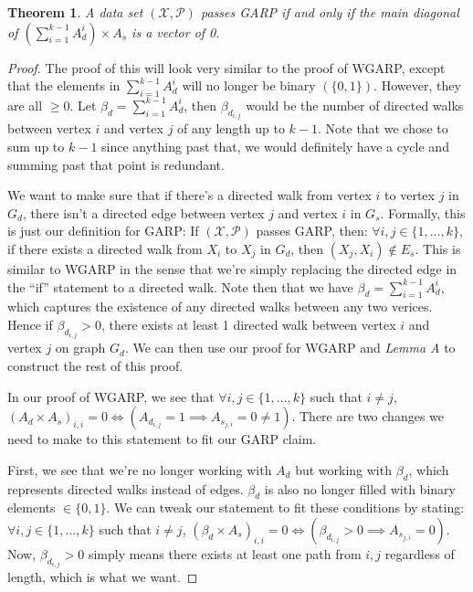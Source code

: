 \documentclass{article} %
\newtheorem{theorem}{Theorem}
\begin{document}
\begin{theorem}
\label{thm:GARP}
A data set $(\mathcal{X},\mathcal{P})$ passes GARP if and only if the main diagonal of $(\sum_{i=1}^{k-1}A_{d}^{i})\times A_s$ is a vector of 0.
\end{theorem}

\begin{proof}
The proof of this will look very similar to the proof of WGARP, except that the elements in $\sum_{i=1}^{k-1}A_{d}^{i}$ will no longer be binary $(\{0,1\})$. However, they are all $\geq0$. Let $\beta_d=\sum_{i=1}^{k-1}A_{d}^{i}$, then $\beta_{d_{i,j}}$ would be the number of directed walks between vertex $i$ and vertex $j$ of any length up to $k-1$. Note that we chose to sum up to $k-1$ since anything past that, we would definitely have a cycle and summing past that point is redundant.


We want to make sure that if there's a directed walk from vertex $i$ to vertex $j$ in $G_d$, there isn't a directed edge between vertex $j$ and vertex $i$ in $G_s$. Formally, this is just our definition for GARP: If $(\mathcal{X},\mathcal{P})$ passes GARP, then: $\forall i,j\in\{1,\dots,k\}$, if there exists a directed walk from $X_i$ to $X_j$ in $G_d$, then $(X_j,X_i)\not\in E_s$. This is similar to WGARP in the sense that we're simply replacing the directed edge in the ``if'' statement to a directed walk. Note then that we have $\beta_d=\sum_{i=1}^{k-1}A_{d}^{i}$, which captures the existence of any directed walks between any two verices. Hence if $\beta_{d_{i,j}}>0$, there exists at least 1 directed walk between vertex $i$ and vertex $j$ on graph $G_d$. We can then use our proof for WGARP and \textit{Lemma A} to construct the rest of this proof.


In our proof of WGARP, we see that $\forall i, j\in\{1,\ldots,k\}$ such that $i\not=j$, $(A_d\times A_s)_{i,i}=0 \iff (A_{d_{i,j}}=1 \implies A_{s_{j,i}}=0\not=1)$. There are two changes we need to make to this statement to fit our GARP claim. 

First, we see that we're no longer working with $A_d$ but working with $\beta_d$, which represents directed walks instead of edges. $\beta_d$ is also no longer filled with binary elements $\in\{0,1\}$. We can tweak our statement to fit these conditions by stating: $\forall i, j\in\{1,\ldots,k\}$ such that $i\not=j$, $(\beta_d\times A_s)_{i,i}=0 \iff (\beta_{d_{i,j}}>0 \implies A_{s_{j,i}}=0)$. Now, $\beta_{d_{i,j}}>0$ simply means there exists at least one path from $i,j$ regardless of length, which is what we want.


\end{proof}
\end{document}

